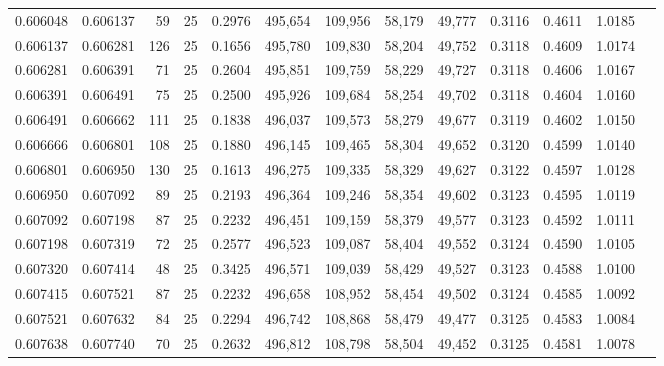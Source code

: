 \begin{tabular}{rrrrrrrrrrrrr}
0.606048 & 0.606137 &    59 &  25 &                                     0.2976 & 495,654 & 109,956 &  58,179 &  49,777 & 0.3116 & 0.4611 & 1.0185 \\
0.606137 & 0.606281 &   126 &  25 &                                     0.1656 & 495,780 & 109,830 &  58,204 &  49,752 & 0.3118 & 0.4609 & 1.0174 \\
0.606281 & 0.606391 &    71 &  25 &                                     0.2604 & 495,851 & 109,759 &  58,229 &  49,727 & 0.3118 & 0.4606 & 1.0167 \\
0.606391 & 0.606491 &    75 &  25 &                                     0.2500 & 495,926 & 109,684 &  58,254 &  49,702 & 0.3118 & 0.4604 & 1.0160 \\
0.606491 & 0.606662 &   111 &  25 &                                     0.1838 & 496,037 & 109,573 &  58,279 &  49,677 & 0.3119 & 0.4602 & 1.0150 \\
0.606666 & 0.606801 &   108 &  25 &                                     0.1880 & 496,145 & 109,465 &  58,304 &  49,652 & 0.3120 & 0.4599 & 1.0140 \\
0.606801 & 0.606950 &   130 &  25 &                                     0.1613 & 496,275 & 109,335 &  58,329 &  49,627 & 0.3122 & 0.4597 & 1.0128 \\
0.606950 & 0.607092 &    89 &  25 &                                     0.2193 & 496,364 & 109,246 &  58,354 &  49,602 & 0.3123 & 0.4595 & 1.0119 \\
0.607092 & 0.607198 &    87 &  25 &                                     0.2232 & 496,451 & 109,159 &  58,379 &  49,577 & 0.3123 & 0.4592 & 1.0111 \\
0.607198 & 0.607319 &    72 &  25 &                                     0.2577 & 496,523 & 109,087 &  58,404 &  49,552 & 0.3124 & 0.4590 & 1.0105 \\
0.607320 & 0.607414 &    48 &  25 &                                     0.3425 & 496,571 & 109,039 &  58,429 &  49,527 & 0.3123 & 0.4588 & 1.0100 \\
0.607415 & 0.607521 &    87 &  25 &                                     0.2232 & 496,658 & 108,952 &  58,454 &  49,502 & 0.3124 & 0.4585 & 1.0092 \\
0.607521 & 0.607632 &    84 &  25 &                                     0.2294 & 496,742 & 108,868 &  58,479 &  49,477 & 0.3125 & 0.4583 & 1.0084 \\
0.607638 & 0.607740 &    70 &  25 &                                     0.2632 & 496,812 & 108,798 &  58,504 &  49,452 & 0.3125 & 0.4581 & 1.0078 \\

\end{tabular}
